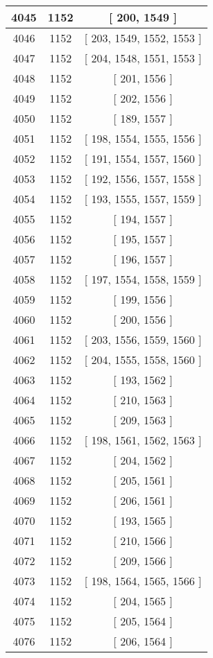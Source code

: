 \begin{center}
\begin{longtable}[H]{|| c c c ||}
\hline
4045 & 1152 & [ 200, 1549 ] \\ 
\hline
4046 & 1152 & [ 203, 1549, 1552, 1553 ] \\ 
\hline
4047 & 1152 & [ 204, 1548, 1551, 1553 ] \\ 
\hline
4048 & 1152 & [ 201, 1556 ] \\ 
\hline
4049 & 1152 & [ 202, 1556 ] \\ 
\hline
4050 & 1152 & [ 189, 1557 ] \\ 
\hline
4051 & 1152 & [ 198, 1554, 1555, 1556 ] \\ 
\hline
4052 & 1152 & [ 191, 1554, 1557, 1560 ] \\ 
\hline
4053 & 1152 & [ 192, 1556, 1557, 1558 ] \\ 
\hline
4054 & 1152 & [ 193, 1555, 1557, 1559 ] \\ 
\hline
4055 & 1152 & [ 194, 1557 ] \\ 
\hline
4056 & 1152 & [ 195, 1557 ] \\ 
\hline
4057 & 1152 & [ 196, 1557 ] \\ 
\hline
4058 & 1152 & [ 197, 1554, 1558, 1559 ] \\ 
\hline
4059 & 1152 & [ 199, 1556 ] \\ 
\hline
4060 & 1152 & [ 200, 1556 ] \\ 
\hline
4061 & 1152 & [ 203, 1556, 1559, 1560 ] \\ 
\hline
4062 & 1152 & [ 204, 1555, 1558, 1560 ] \\ 
\hline
4063 & 1152 & [ 193, 1562 ] \\ 
\hline
4064 & 1152 & [ 210, 1563 ] \\ 
\hline
4065 & 1152 & [ 209, 1563 ] \\ 
\hline
4066 & 1152 & [ 198, 1561, 1562, 1563 ] \\ 
\hline
4067 & 1152 & [ 204, 1562 ] \\ 
\hline
4068 & 1152 & [ 205, 1561 ] \\ 
\hline
4069 & 1152 & [ 206, 1561 ] \\ 
\hline
4070 & 1152 & [ 193, 1565 ] \\ 
\hline
4071 & 1152 & [ 210, 1566 ] \\ 
\hline
4072 & 1152 & [ 209, 1566 ] \\ 
\hline
4073 & 1152 & [ 198, 1564, 1565, 1566 ] \\ 
\hline
4074 & 1152 & [ 204, 1565 ] \\ 
\hline
4075 & 1152 & [ 205, 1564 ] \\ 
\hline
4076 & 1152 & [ 206, 1564 ] \\ 

\end{longtable}
\end{center}
